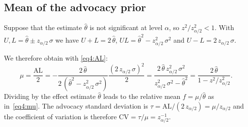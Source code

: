 \begin{subappendices}
\renewcommand{\thesection}{\Alph{section}}
\section{Mean of the advocacy prior}
\label{app:app1}
Suppose that the estimate $\hat \theta$ is not significant at level $\alpha$, so
$z^2/z_{\alpha/2}^2<1$. With $U,L = \hat \theta \pm z_{\alpha/2} \, \sigma$ we
have $U + L = 2 \, \hat \theta$,
$U L = \hat \theta^2 - z_{\alpha/2}^2 \, \sigma^2$ and $U-L =
2 \, z_{\alpha/2} \, \sigma$.

We therefore obtain with \eqref{eq4:AL}:
\begin{equation*}
\mu = \frac{\mbox{AL}}{2} =  - \frac{2 \, \hat \theta}{2 \, (\hat \theta^2 - z_{\alpha/2}^2 \, \sigma^2)} \frac{(2 \, z_{\alpha/2} \, \sigma)^2}{2}
 =  \frac{2 \, \hat \theta \, z_{\alpha/2}^2 \, \sigma^2}{z_{\alpha/2}^2 \, \sigma^2 - \hat \theta^2}
 =  \frac{2 \, \hat \theta}{1 - z^2/z_{\alpha/2}^2}.
\end{equation*}
Dividing by the effect estimate $\hat{\theta}$ leads to the relative mean
$f = \mu/\hat{\theta}$ as in~\eqref{eq4:mu}. The advocacy standard deviation is
$\tau = {\mbox{AL}}/{(2 \, z_{\alpha/2})} = {\mu}/{z_{\alpha/2}}$ and the
coefficient of variation is therefore
$\mbox{CV} = \tau/\mu = z_{\alpha/2}^{-1}$.


\end{subappendices}
